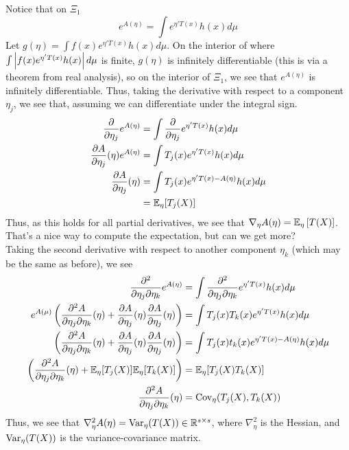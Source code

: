 Notice that on $\Xi_1$
\[ e^{A(\eta)} = \int e^{\eta'T(x)}h(x)d\mu \]
Let $g(\eta) = \int f(x)e^{\eta'T(x)}h(x)d\mu$. On the interior of where $\int \abs{f(x)e^{\eta'T(x)}h(x)}d\mu$ is finite, $g(\eta)$ is infinitely differentiable (this is via a theorem from real analysis), so on the interior of $\Xi_1$, we see that $e^{A(\eta)}$ is infinitely differentiable. Thus, taking the derivative with respect to a component $\eta_j$, we see that, assuming we can differentiate under the integral sign. 
\begin{align*}
    \frac{\del}{\del \eta_j} e^{A(\eta)} &= \int \frac{\del}{\del \eta_j} e^{\eta'T(x)}h(x)d\mu\\
    \frac{\del A}{\del \eta_j}(\eta)e^{A(\eta)} &= \int T_{j}(x)e^{\eta'T(x)}h(x)d\mu\\
    \frac{\del A}{\del \eta_j}(\eta) &= \int T_{j}(x)e^{\eta'T(x) - A(\eta)}h(x)d\mu\\
    &= \bb{E}_{\eta}[T_{j}(X)]
\end{align*}
Thus, as this holds for all partial derivatives, we see that $\nabla_{\eta}A(\eta) = \bb{E}_{\eta}\left[T(X)\right]$. That's a nice way to compute the expectation, but can we get more?\\

Taking the second derivative with respect to another component $\eta_k$ (which may be the same as before), we see
\begin{align*}
    \frac{\del^2}{\del \eta_j \del \eta_k}e^{A(\eta)} &= \int \frac{\del^2}{\del \eta_j \del \eta_k} e^{\eta'T(x)}h(x)d\mu\\
    e^{A(\mu)}\left(\frac{\del^2A}{\del \eta_j\del\eta_k}(\eta) + \frac{\del A}{\del \eta_j}(\eta)\frac{\del A}{\del \eta_j}(\eta)\right) &= \int T_{j}(x)T_{k}(x)e^{\eta'T(x)}h(x)d\mu\\
    \left(\frac{\del^2A}{\del \eta_j\del\eta_k}(\eta) + \frac{\del A}{\del \eta_j}(\eta)\frac{\del A}{\del \eta_j}(\eta)\right) &= \int T_{j}(x)t_{k}(x)e^{\eta'T(x) - A(\eta)}h(x)d\mu\\
    \left(\frac{\del^2 A}{\del\eta_j\del\eta_k}(\eta) + \bb{E}_{\eta}[T_{j}(X)]\bb{E}_{\eta}[T_{k}(X)]\right) &= \mathbb{E}_{\eta}[T_j(X)T_k(X)]\\
    \frac{\del^2A}{\del \eta_j \del \eta_k}(\eta) &= \tt{Cov}_{\eta}(T_{j}(X), T_{k}(X))
\end{align*}
Thus, we see that $\nabla_{\eta}^2 A(\eta) = \tt{Var}_{\eta}(T(X)) \in \R^{s \times s}$, where $\nabla_{\eta}^2$ is the Hessian, and $\tt{Var}_{\eta}(T(X))$ is the variance-covariance matrix.\\

